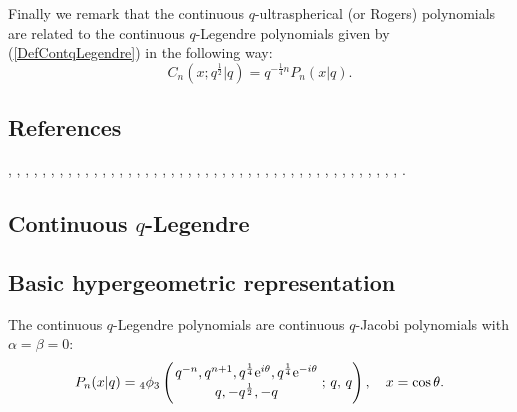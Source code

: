 \documentclass[envcountchap,graybox]{svmono}
\newcommand{\qhyp}[5]{\mbox{}_{#1}{\phi}_{#2}
\left(\genfrac{}{}{0pt}{}{#3}{#4}\,;\,q,\,#5\right)}
\newcommand{\e}{\textrm{e}}
\begin{document}
\noindent
Finally we remark that the continuous $q$-ultraspherical (or Rogers)
polynomials are related to the continuous $q$-Legendre polynomials given by (\ref{DefContqLegendre}) in the following way:
$$C_n(x;q^{\frac{1}{2}}|q)=q^{-\frac{1}{4}n}P_n(x|q).$$

\subsection*{References}
\cite{AlSalamAllaway84I}, \cite{AlSalamAllaway84II}, \cite{AlSalam90}, \cite{AndrewsAskey85},
\cite{Askey89I}, \cite{Askey89II}, \cite{Askey89III}, \cite{AskeyIsmail80},
\cite{AskeyIsmail83}, \cite{AskeyIsmail84}, \cite{AskeyKoornRahman}, \cite{AskeyWilson85},
\cite{AtakRahmanSuslov}, \cite{Bressoud81}, \cite{BustozIsmail82}, \cite{BustozIsmail83},
\cite{FloreaniniVinetI}, \cite{Gasper81}, \cite{Gasper85}, \cite{Gasper89},
\cite{GasperRahman83II}, \cite{GasperRahman86}, \cite{GasperRahman89}, \cite{GasperRahman90},
\cite{Ismail86I}, \cite{IsmailMassonSuslov}, \cite{IsmailStanton88}, \cite{IsmailStanton97},
\cite{IsmailZhang}, \cite{Koelink95II}, \cite{Koelink96I}, \cite{Koorn90I}, \cite{Koorn2005},
\cite{Koorn2007}, \cite{Liu}, \cite{NassrallahRahman}, \cite{Nikiforov+}, \cite{NoumiMimachi91},
\cite{Rahman88}, \cite{Rahman92}, \cite{RahmanVerma86I}, \cite{RahmanVerma86II},
\cite{RahmanVerma87}, \cite{Rogers93}, \cite{Rogers94}, \cite{Rogers95}, \cite{Spiridonov96}.


\subsection{Continuous $q$-Legendre}
\par

\subsection*{Basic hypergeometric representation} The continuous $q$-Legendre polynomials are continuous
$q$-Jacobi polynomials with $\alpha=\beta=0$:
\begin{equation}
\label{DefContqLegendre}
P_n(x|q)=\qhyp{4}{3}{q^{-n},q^{n+1},q^{\frac{1}{4}}\e^{i\theta},
q^{\frac{1}{4}}\e^{-i\theta}}{q,-q^{\frac{1}{2}},-q}{q},\quad x=\cos\theta.
\end{equation}
\end{document}
